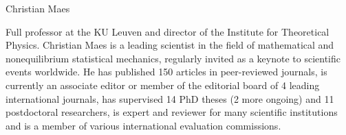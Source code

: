 \begin{participant}[type=PI,PM=12,gender=male,salary=5500]{Christian Maes}

Full professor at the KU Leuven and director of the Institute for Theoretical Physics.
%
Christian Maes is a leading scientist in the field of mathematical and nonequilibrium statistical mechanics, regularly
invited as a keynote to scientific events worldwide.
%
He has published 150 articles in peer-reviewed journals,
is currently an associate editor or member of the editorial board of 4 leading international journals,
has supervised 14 PhD theses (2 more ongoing) and 11 postdoctoral researchers,
is expert and reviewer for many scientific institutions and
is a member of various international evaluation commissions.

\end{participant}

